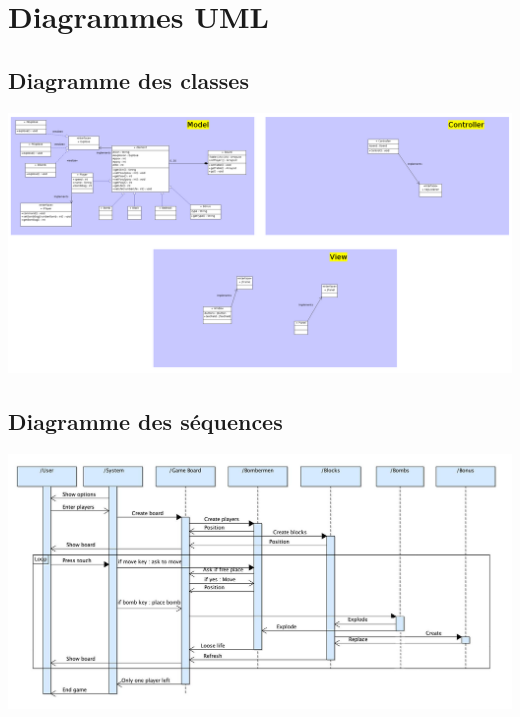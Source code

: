 \newpage
\section{Diagrammes UML}
	
	\subsection{Diagramme des classes}

	\includegraphics[scale = 0.2]{ch3/Diagrammedeclasses}
	

	
	\subsection{Diagramme des séquences}
  	\includegraphics[scale=0.25]{ch3/DiagrammeSeq}
